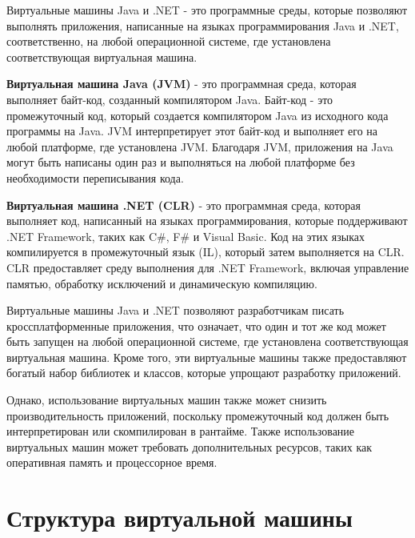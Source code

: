 Виртуальные машины Java и .NET - это программные среды, которые позволяют выполнять приложения, написанные на языках программирования Java и .NET, соответственно, на любой операционной системе, где установлена соответствующая виртуальная машина.

\textbf{Виртуальная машина Java (JVM)} - это программная среда, которая выполняет байт-код, созданный компилятором Java. Байт-код - это промежуточный код, который создается компилятором Java из исходного кода программы на Java. JVM интерпретирует этот байт-код и выполняет его на любой платформе, где установлена JVM. Благодаря JVM, приложения на Java могут быть написаны один раз и выполняться на любой платформе без необходимости переписывания кода.

\textbf{Виртуальная машина .NET (CLR)} - это программная среда, которая выполняет код, написанный на языках программирования, которые поддерживают .NET Framework, таких как C#, F# и Visual Basic. Код на этих языках компилируется в промежуточный язык (IL), который затем выполняется на CLR. CLR предоставляет среду выполнения для .NET Framework, включая управление памятью, обработку исключений и динамическую компиляцию.

Виртуальные машины Java и .NET позволяют разработчикам писать кроссплатформенные приложения, что означает, что один и тот же код может быть запущен на любой операционной системе, где установлена соответствующая виртуальная машина. Кроме того, эти виртуальные машины также предоставляют богатый набор библиотек и классов, которые упрощают разработку приложений.

Однако, использование виртуальных машин также может снизить производительность приложений, поскольку промежуточный код должен быть интерпретирован или скомпилирован в рантайме. Также использование виртуальных машин может требовать дополнительных ресурсов, таких как оперативная память и процессорное время.

\section{Структура виртуальной машины}

